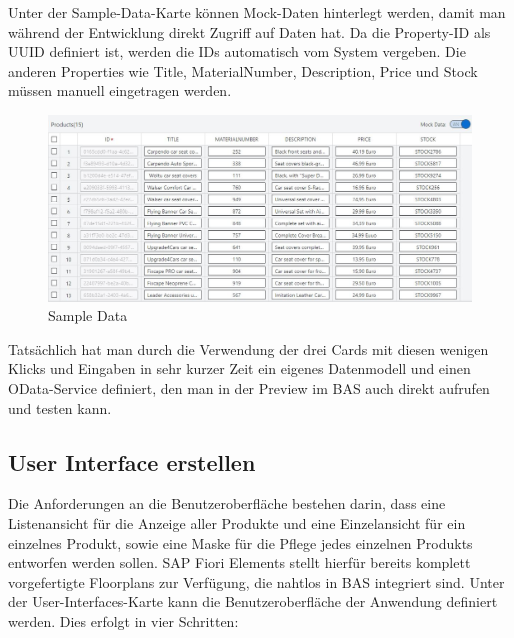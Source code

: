 Unter der Sample-Data-Karte können Mock-Daten hinterlegt werden, damit man während der Entwicklung direkt Zugriff auf Daten hat. Da die Property-ID als UUID definiert ist, werden die IDs automatisch vom System vergeben. Die anderen Properties wie Title, MaterialNumber, Description, Price und Stock müssen manuell eingetragen werden.

\begin{figure}[htbp]
 \centering
 \includegraphics[width=1.0\textwidth]{Bilder/fiori_element/3_6_Sample_Data.JPG}
 \caption{Sample Data}
\end{figure}

Tatsächlich hat man durch die Verwendung der drei Cards mit diesen wenigen Klicks und Eingaben in sehr kurzer Zeit ein eigenes Datenmodell und einen OData-Service definiert, den man in der Preview im BAS auch direkt aufrufen und testen kann.

\subsection{User Interface erstellen }

Die Anforderungen an die Benutzeroberfläche bestehen darin, dass eine Listenansicht für die Anzeige aller Produkte und eine Einzelansicht für ein einzelnes Produkt, sowie eine Maske für die Pflege jedes einzelnen Produkts entworfen werden sollen. SAP Fiori Elements stellt hierfür bereits komplett vorgefertigte Floorplans zur Verfügung, die nahtlos in BAS integriert sind.
Unter der User-Interfaces-Karte kann die Benutzeroberfläche der Anwendung definiert werden. Dies erfolgt in vier Schritten: 

